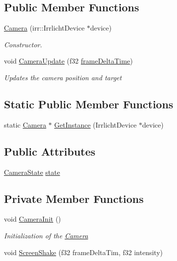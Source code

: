 \subsection*{Public Member Functions}
\begin{DoxyCompactItemize}
\item 
\hyperlink{class_camera_a8dcadcfd314ecb49ac224a7e6d0bffde}{Camera} (irr\-::\-Irrlicht\-Device $\ast$device)
\begin{DoxyCompactList}\small\item\em Constructor. \end{DoxyCompactList}\item 
void \hyperlink{class_camera_a76e6167aa081ea6755d0bf588cd8cb73}{Camera\-Update} (f32 \hyperlink{_player_8cpp_adc988571147642cda93afbf89783f9c9}{frame\-Delta\-Time})
\begin{DoxyCompactList}\small\item\em Updates the camera position and target \end{DoxyCompactList}\end{DoxyCompactItemize}
\subsection*{Static Public Member Functions}
\begin{DoxyCompactItemize}
\item 
static \hyperlink{class_camera}{Camera} $\ast$ \hyperlink{class_camera_aae2256f0ee62dd982d92c09d9d00c8d5}{Get\-Instance} (Irrlicht\-Device $\ast$device)
\end{DoxyCompactItemize}
\subsection*{Public Attributes}
\begin{DoxyCompactItemize}
\item 
\hyperlink{class_camera_a1ddf5d726e6c1d1d1c08d96d42c40236}{Camera\-State} \hyperlink{class_camera_a87960570c2d28bd4471c5a74fc021cb5}{state}
\end{DoxyCompactItemize}
\subsection*{Private Member Functions}
\begin{DoxyCompactItemize}
\item 
void \hyperlink{class_camera_ab31de25cd3c79eb40dcb785fa280cda6}{Camera\-Init} ()
\begin{DoxyCompactList}\small\item\em Initialization of the \hyperlink{class_camera}{Camera} \end{DoxyCompactList}\item 
void \hyperlink{class_camera_a2a8b4c795eef0ecc8069f4ee9fe75fb3}{Screen\-Shake} (f32 frame\-Delta\-Tim, f32 intensity)
\end{DoxyCompactItemize}
